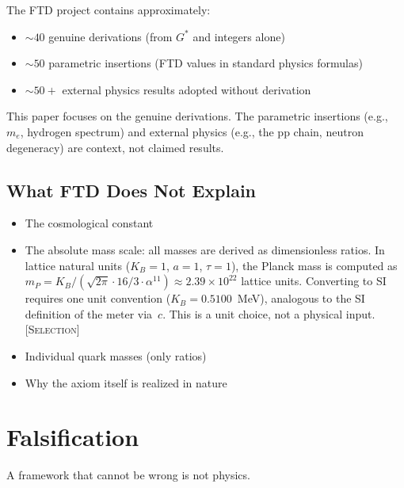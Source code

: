 \documentclass[12pt]{article}
\newcommand{\etag}[1]{{\normalfont\textsc{\footnotesize [#1]}}}
\theoremstyle{compact}
\begin{document}
The FTD project contains approximately:
\begin{itemize}[nosep]
\item $\sim 40$ genuine derivations (from ${G^{*}}$ and integers alone)
\item $\sim 50$ parametric insertions (FTD values in standard physics formulas)
\item $\sim 50+$ external physics results adopted without derivation
\end{itemize}
This paper focuses on the genuine derivations. The parametric insertions (e.g., $m_e$, hydrogen spectrum) and external physics (e.g., the pp chain, neutron degeneracy) are context, not claimed results.

\subsection*{What FTD Does Not Explain}
\begin{itemize}[nosep]
\item The cosmological constant
\item The absolute mass scale: all masses are derived as dimensionless ratios. In lattice natural units ($K_B = 1$, $a = 1$, $\tau = 1$), the Planck mass is computed as $m_P = K_B/(\sqrt{2\pi}\cdot 16/3 \cdot \alpha^{11}) \approx 2.39 \times 10^{22}$ lattice units. Converting to SI requires one unit convention ($K_B = 0.5100$~MeV), analogous to the SI definition of the meter via~$c$. This is a unit choice, not a physical input. \etag{Selection}
\item Individual quark masses (only ratios)
\item Why the axiom itself is realized in nature
\end{itemize}


\section{Falsification}
\label{sec:falsification}

A framework that cannot be wrong is not physics.
\end{document}
